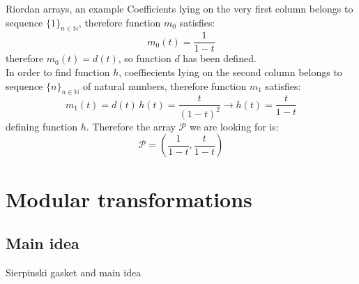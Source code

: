 \documentclass[10pt,serif, professionalfont]{beamer}
\begin{document}
\begin{frame}{Riordan arrays, an example}
    Coefficients lying on the very first column belongs to 
    sequence $\lbrace1\rbrace_{n\in\mathbb{N}}$, therefore function $m_{0}$
    satisfies:
    \begin{displaymath}
        m_{0}(t)=\frac{1}{1-t}
    \end{displaymath}
    therefore $m_{0}(t)=d(t)$, so function $d$ has been defined. \\
    \pause
    In order to find function $h$, coeffiecients lying on the second column 
    belongs to sequence $\lbrace n\rbrace_{n\in\mathbb{N}}$ of natural numbers,
    therefore function $m_{1}$ satisfies:
    \begin{displaymath}
        m_{1}(t)=d(t)\,h(t)=\frac{t}{(1-t)^{2}} \rightarrow
        h(t)=\frac{t}{1-t}
    \end{displaymath}
    defining function $h$. Therefore the array $\mathcal{P}$ we are looking for is:
    \begin{equation}
        \mathcal{P}=\left(\frac{1}{1-t},\frac{t}{1-t}\right)
        \label{eq:pascal:array:derived:for:example}
    \end{equation}
\end{frame}

\section{Modular transformations}

\subsection{Main idea}

\begin{frame}{Sierpinski gasket and main idea}
    \begin{columns}[T] %
        \begin{column}[T]{5cm} %
        \end{column}
        \begin{column}[T]{5cm} %
        \end{column}
    \end{columns}
\end{frame}
\end{document}
